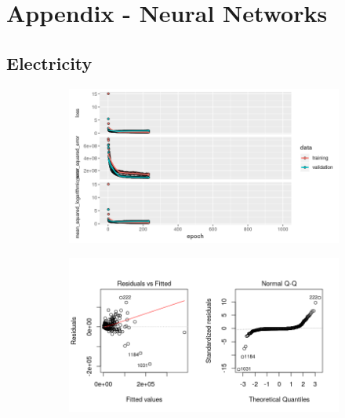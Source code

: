 \section*{Appendix - Neural Networks}
\label{sec:appendix_nn}
\appendix
\subsection{Electricity}
\label{appendix_nn:electricity:nn_full}
\begin{figure}[h]
\begin{subfigure}{1\textwidth}
\centering
\includegraphics[width=.99\textwidth, height=0.4\textheight]{Images/electricity_nn_full_train_results.png}
\end{subfigure}
\begin{subfigure}{1\textwidth}
\centering
\includegraphics[width=.99\textwidth, height=0.3\textheight]{Images/electricity_nn_full_resid_1.png}
\end{subfigure}
\end{figure}
\newpage
